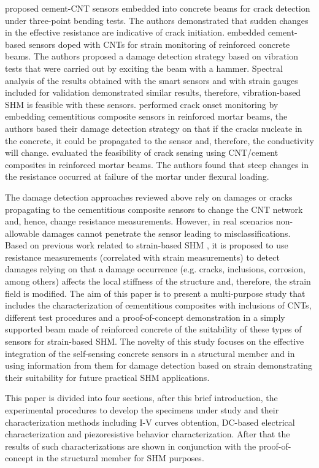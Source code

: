 \documentclass[twocolumn]{bmcart}%
\begin{document}
\cite{Saafi2009} proposed cement-CNT sensors embedded into concrete beams for crack detection under three-point bending tests. The authors demonstrated that sudden changes in the effective resistance are indicative of crack initiation. \cite{DAlessandro2016b} embedded cement-based sensors doped with CNTs for strain monitoring of reinforced concrete beams. The authors proposed a damage detection strategy based on vibration tests that were carried out by exciting the beam with a hammer. Spectral analysis of the results obtained with the smart sensors and with strain gauges included for validation demonstrated similar results, therefore, vibration-based SHM is feasible with these sensors. \cite{Lim2017} performed crack onset monitoring by embedding  cementitious composite sensors in reinforced mortar beams, the authors based their damage detection strategy on that if the cracks nucleate in the concrete, it could be propagated to the sensor and, therefore, the conductivity will change. \cite{Naeem2017a} evaluated the feasibility of crack sensing using CNT/cement composites in reinforced mortar beams. The authors found that steep changes in the resistance occurred at failure of the mortar under flexural loading. 

The damage detection approaches reviewed above rely on damages or cracks propagating to the cementitious composite sensors to change the CNT network and, hence, change resistance measurements. However, in real scenarios non-allowable damages cannot penetrate the sensor leading to misclassifications. Based on previous work related to strain-based SHM \cite{Sierra-Perez2015, Sierra-Perez2018}, it is proposed to use resistance measurements (correlated with strain measurements) to detect damages relying on that a damage occurrence (e.g. cracks, inclusions, corrosion, among others) affects the local stiffness of the structure and, therefore, the strain field is modified.  
The aim of this paper is to present a multi-purpose study that includes the characterization of cementitious composites with inclusions of CNTs, different test procedures and a proof-of-concept demonstration in a simply supported beam made of reinforced concrete of the suitability of these types of sensors for strain-based SHM. The novelty of this study focuses on the effective integration of the self-sensing concrete sensors in a structural member and in using information from them for damage detection based on strain demonstrating their suitability for future practical SHM applications.

This paper is divided into four sections, after this brief introduction, the experimental procedures to develop the specimens under study and their characterization methods including I-V curves obtention, DC-based electrical characterization and piezoresistive behavior characterization. After that the results of such characterizations are shown in conjunction with the proof-of-concept in the structural member for SHM purposes.
\end{document}
